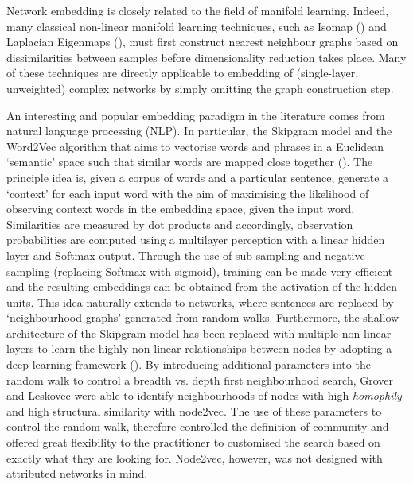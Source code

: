 \documentclass{IEEEtran}
\begin{document}
	Network embedding is closely related to the field of manifold learning. 
	Indeed, many classical non-linear manifold learning techniques, such as Isomap (\cite{tenenbaum2000global}) and Laplacian Eigenmaps (\cite{belkin2002laplacian}), must first construct nearest neighbour graphs based on dissimilarities between samples before dimensionality reduction takes place. 
	Many of these techniques are directly applicable to embedding of (single-layer, unweighted) complex networks by simply omitting the graph construction step.
	
	An interesting and popular embedding paradigm in the literature comes from natural language processing (NLP). 
	In particular, the Skipgram model and the Word2Vec algorithm that aims to vectorise words and phrases in a Euclidean `semantic' space such that similar words are mapped close together (\cite{mikolov2013distributed,mikolov2013efficient}). 
	The principle idea is, given a corpus of words and a particular sentence, generate a `context' for each input word with the aim of maximising the likelihood of observing context words in the embedding space, given the input word. 
	Similarities are measured by dot products and accordingly, observation probabilities are computed using a multilayer perception with a linear hidden layer and Softmax output. Through the use of sub-sampling and negative sampling (replacing Softmax with sigmoid), training can be made very efficient and the resulting embeddings can be obtained from the activation of the hidden units. This idea naturally extends to networks, where sentences are replaced by `neighbourhood graphs' generated from random walks. 
	Furthermore, the shallow architecture of the Skipgram model has been replaced with multiple non-linear layers to learn the highly non-linear relationships between nodes by adopting a deep learning framework (\cite{perozzi2014deepwalk,tang2015line}).
	By introducing additional parameters into the random walk to control a breadth vs. depth first neighbourhood search, Grover and Leskovec \cite{grover2016node2vec} were able to identify neighbourhoods of nodes with high \textit{homophily} and high structural similarity with node2vec. 
	The use of these parameters to control the random walk, therefore controlled the definition of community and offered great flexibility to the practitioner to customised the search based on exactly what they are looking for. 
	Node2vec, however, was not designed with attributed networks in mind. 
	
\end{document}
